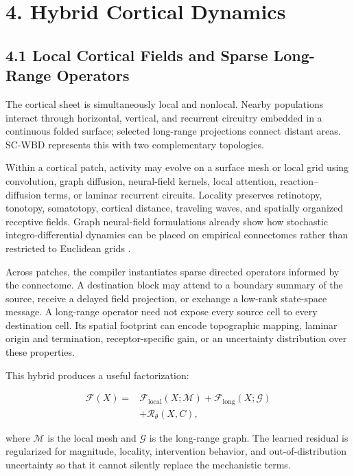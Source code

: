 \TimescaleFigure

\section{4. Hybrid Cortical Dynamics}

\subsection{4.1 Local Cortical Fields and Sparse Long-Range Operators}

The cortical sheet is simultaneously local and nonlocal. Nearby populations
interact through horizontal, vertical, and recurrent circuitry embedded in a
continuous folded surface; selected long-range projections connect distant
areas. SC-WBD represents this with two complementary topologies.

Within a cortical patch, activity may evolve on a surface mesh or local grid
using convolution, graph diffusion, neural-field kernels, local attention,
reaction--diffusion terms, or laminar recurrent circuits. Locality preserves
retinotopy, tonotopy, somatotopy, cortical distance, traveling waves, and
spatially organized receptive fields. Graph neural-field formulations already
show how stochastic integro-differential dynamics can be placed on empirical
connectomes rather than restricted to Euclidean grids \citep{aqil2021}.

Across patches, the compiler instantiates sparse directed operators informed by
the connectome. A destination block may attend to a boundary summary of the
source, receive a delayed field projection, or exchange a low-rank state-space
message. A long-range operator need not expose every source cell to every
destination cell. Its spatial footprint can encode topographic mapping,
laminar origin and termination, receptor-specific gain, or an uncertainty
distribution over these properties.

This hybrid produces a useful factorization:

\[
\begin{aligned}
\mathcal{F}(X)={}&
\mathcal{F}_{\mathrm{local}}(X;\mathcal{M})
+\mathcal{F}_{\mathrm{long}}(X;\mathcal{G})\\
&+\mathcal{R}_{\theta}(X,C),
\end{aligned}
\]

where \(\mathcal{M}\) is the local mesh and \(\mathcal{G}\) is the long-range
graph. The learned residual is regularized for magnitude, locality,
intervention behavior, and out-of-distribution uncertainty so that it cannot
silently replace the mechanistic terms.

